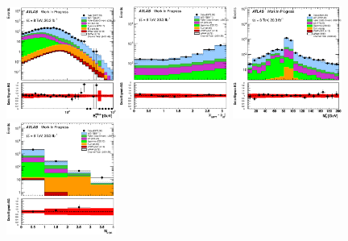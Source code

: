 \begin{figure}[ht!]
\includegraphics[width=0.32\textwidth]{figures/appendix_signal_selection/Nov24Update_FakeSys_KFacSys_LogY_NoRebin/output/jobs/MxM/DataFull_Rates_May13_FakeRatesExactly2Loose_MuonMxMBJetGt0_ElBJetGt0SubtractPC_MxM/PreselectionNov23_15_physics/weight_all/eps/MET_Et_histratio.eps}
\includegraphics[width=0.32\textwidth]{figures/appendix_signal_selection/Nov24Update_FakeSys_KFacSys_LogY_NoRebin/output/jobs/MxM/DataFull_Rates_May13_FakeRatesExactly2Loose_MuonMxMBJetGt0_ElBJetGt0SubtractPC_MxM/PreselectionNov23_15_physics/weight_all/eps/DeltaPhiMET123_Abs_histratio.eps}
\includegraphics[width=0.32\textwidth]{figures/appendix_signal_selection/Nov24Update_FakeSys_KFacSys_LogY_NoRebin/output/jobs/MxM/DataFull_Rates_May13_FakeRatesExactly2Loose_MuonMxMBJetGt0_ElBJetGt0SubtractPC_MxM/PreselectionNov23_15_physics/weight_all/eps/InvariantMassSFOS_histratio.eps}
\includegraphics[width=0.32\textwidth]{figures/appendix_signal_selection/Nov24Update_FakeSys_KFacSys_LogY_NoRebin/output/jobs/MxM/DataFull_Rates_May13_FakeRatesExactly2Loose_MuonMxMBJetGt0_ElBJetGt0SubtractPC_MxM/PreselectionNov23_15_physics/weight_all/eps/NBTaggedJets_histratio.eps}

\end{figure}
